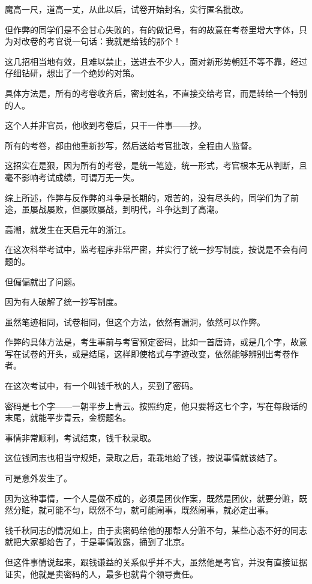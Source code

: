\begin{multicols}{\theparacolNo}
		魔高一尺，道高一丈，从此以后，试卷开始封名，实行匿名批改。

		但作弊的同学们是不会甘心失败的，有的做记号，有的故意在考卷里增大字体，只为对改卷的考官说一句话：我就是给钱的那个！

		这几招相当地有效，且难以禁止，送进去不少人，面对新形势朝廷不等不靠，经过仔细钻研，想出了一个绝妙的对策。

		具体方法是，所有的考卷收齐后，密封姓名，不直接交给考官，而是转给一个特别的人。

		这个人并非官员，他收到考卷后，只干一件事——抄。

		所有的考卷，都由他重新抄写，然后送给考官批改，全程由人监督。

		这招实在是狠，因为所有的考卷，是统一笔迹，统一形式，考官根本无从判断，且毫不影响考试成绩，可谓万无一失。

		综上所述，作弊与反作弊的斗争是长期的，艰苦的，没有尽头的，同学们为了前途，虽屡战屡败，但屡败屡战，到明代，斗争达到了高潮。

		高潮，就发生在天启元年的浙江。

		在这次科举考试中，监考程序非常严密，并实行了统一抄写制度，按说是不会有问题的。

		但偏偏就出了问题。

		因为有人破解了统一抄写制度。

		虽然笔迹相同，试卷相同，但这个方法，依然有漏洞，依然可以作弊。

		作弊的具体方法是，考生事前与考官预定密码，比如一首唐诗，或是几个字，故意写在试卷的开头，或是结尾，这样即使格式与字迹改变，依然能够辨别出考卷作者。

		在这次考试中，有一个叫钱千秋的人，买到了密码。

		密码是七个字——一朝平步上青云。按照约定，他只要将这七个字，写在每段话的末尾，就能平步青云，金榜题名。

		事情非常顺利，考试结束，钱千秋录取。

		这位钱同志也相当守规矩，录取之后，乖乖地给了钱，按说事情就该结了。

		可是意外发生了。

		因为这种事情，一个人是做不成的，必须是团伙作案，既然是团伙，就要分赃，既然分赃，就可能不匀，既然不匀，就可能闹事，既然闹事，就必定出事。

		钱千秋同志的情况如上，由于卖密码给他的那帮人分赃不匀，某些心态不好的同志就把大家都给告了，于是事情败露，捅到了北京。

		但这件事情说起来，跟钱谦益的关系似乎并不大，虽然他是考官，并没有直接证据证实，他就是卖密码的人，最多也就背个领导责任。


\end{multicols}
